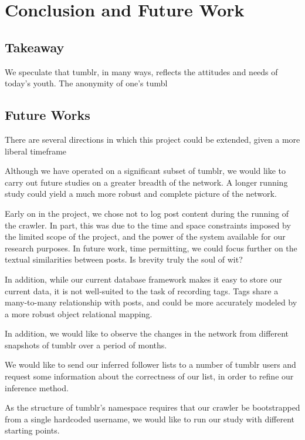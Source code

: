 \section{Conclusion and Future Work}
\label{sec:-conc}
\subsection{Takeaway}
We speculate that tumblr, in many ways, reflects the attitudes and 
needs of today's youth.  The anonymity of one's tumbl

\subsection{Future Works}
There are several directions in which this project could be extended, 
given a more liberal timeframe


Although we have operated on a significant subset of tumblr, we
would like to carry out future studies on a greater breadth of the 
network.  A longer running study could yield a much more robust and 
complete picture of the network.

Early on in the project, we chose not to log post content during the 
running of the crawler.  In part, this was due to the time and space 
constraints imposed by the limited scope of the project, and the power 
of the system available for our research purposes.  In future work, 
time permitting, we could focus further on the textual similarities 
between posts.  Is brevity truly the soul of wit?

In addition, while our current database framework makes it easy to store 
our current data, it is not well-suited to the task of recording tags.  
Tags share a many-to-many relationship with posts, and could be more 
accurately modeled by a more robust object relational mapping.


In addition, we would like to observe the changes in the network from 
different snapshots of tumblr over a period of months.

We would like to send our inferred follower lists to a number of 
tumblr users and request some information about the correctness of our 
list, in order to refine our inference method.

As the structure of tumblr's namespace requires that our crawler be 
bootstrapped from a single hardcoded username, we would like to run our 
study with different starting points.

